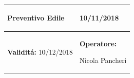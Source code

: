 \documentclass[a4paper]{article}
\begin{document}
                          \begin{center}
                          \begin{tabular}{|L{89mm} R{60mm}| }
                          \hline
                          \vspace{2.5mm}
                          \begin{spacing}{0}
                            \textbf{Preventivo Edile}
                          \end{spacing}&
                          \vspace{2.5mm}
                          \begin{spacing}{0}
        
                     10/11/2018

                          \end{spacing}\\
                          \hline
                          \vspace{2.5mm}
                          \begin{spacing}{0}
                            \textbf{Validit\'a:}
                       10/12/2018
                          \end{spacing} &
                          \vspace{2.5mm}
                          \begin{spacing}{0}
                            \textbf{Operatore:}

                       Nicola Pancheri
                          \end{spacing} \\
                          \hline
                          \end{tabular}
                          \end{center}
                        
\end{document}
